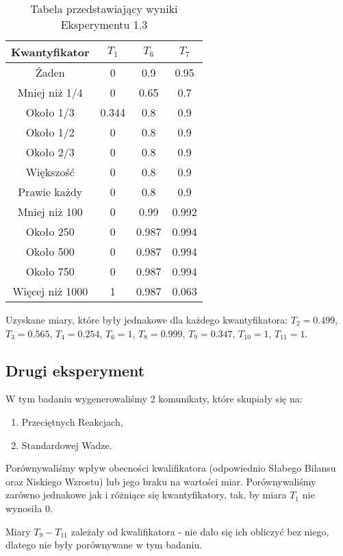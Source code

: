 \documentclass{classrep}
\begin{document}
\begin{table}[H]
	\centering
	\begin{tabular}{c c c c} 
		\hline
		\textbf{Kwantyfikator} & \textbf{$T_1$} & \textbf{$T_6$} & \textbf{$T_7$}\\ [0.5ex] 
		\hline
		\hline 
		Żaden & 0 & 0.9 & 0.95 \\ 
		Mniej niż 1/4 & 0 & 0.65 & 0.7 \\
		Około 1/3 & 0.344 & 0.8 & 0.9 \\
		Około 1/2 & 0 & 0.8 & 0.9 \\
		Około 2/3 & 0 & 0.8 & 0.9 \\
		Większość & 0 & 0.8 & 0.9  \\
		Prawie każdy & 0 & 0.8 & 0.9  \\
		Mniej niż 100 & 0 & 0.99 & 0.992  \\
		Około 250 & 0 & 0.987 & 0.994  \\
		Około 500 & 0 & 0.987 & 0.994  \\
		Około 750 & 0 & 0.987 & 0.994  \\
		Więcej niż 1000 & 1 & 0.987 & 0.063  \\
		\hline
	\end{tabular}
	\caption{Tabela przedstawiający wyniki Eksperymentu 1.3}
\end{table}

Uzyskane miary, które były jednakowe dla każdego kwantyfikatora: $T_2 = 0.499$, $T_3 = 0.565$, $T_4 = 0.254$, $T_6 = 1$, $T_8 = 0.999$, $T_9 = 0.347$, $T_{10} = 1$, $T_{11} = 1$.

\subsection{Drugi eksperyment}

W tym badaniu wygenerowaliśmy 2 komunikaty, które skupiały się na:
\begin{enumerate}
	\item Przeciętnych Reakcjach,
	\item Standardowej Wadze.
\end{enumerate}
Porównywaliśmy wpływ obecności kwalifikatora (odpowiednio Słabego Bilansu oraz Niskiego Wzrostu) lub jego braku na wartości miar. Porównywaliśmy zarówno jednakowe jak i różniące się kwantyfikatory, tak, by miara $T_1$ nie wynosiła 0.

Miary $T_9-T_{11}$ zależały od kwalifikatora - nie dało się ich obliczyć bez niego, dlatego nie były porównywane w tym badaniu.
\end{document}
